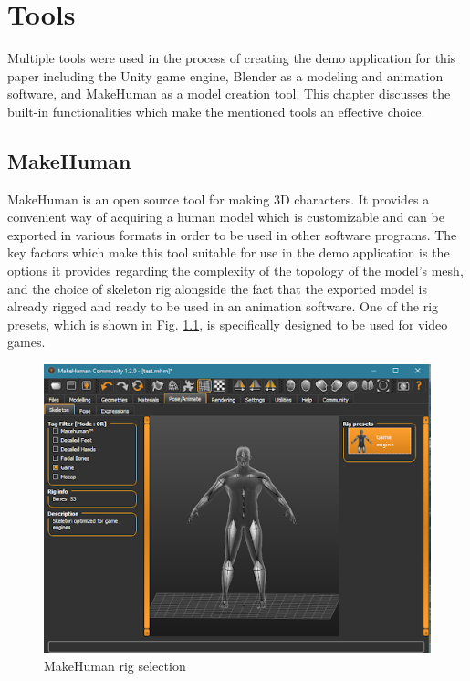 \chapter{Tools} 
Multiple tools were used in the process of creating the demo application for
this paper including the Unity game engine, Blender as a modeling and animation
software, and MakeHuman as a model creation tool. This chapter discusses the
built-in functionalities which make the mentioned tools an effective choice.

\section{MakeHuman}
MakeHuman is an open source tool for making 3D characters. It provides
a convenient way of acquiring a human model which is customizable and can be
exported in various formats in order to be used in other software programs. The
key factors which make this tool suitable for use in the demo application is the
options it provides regarding the complexity of the topology of the model's
mesh, and the choice of skeleton rig alongside the fact that the exported model
is already rigged and ready to be used in an animation software. One of the rig
presets, which is shown in Fig. \ref{fig:mh_rig}, is specifically designed to be
used for video games.

\begin{figure}
    \centering
    \includegraphics[width=\textwidth]{grafika/make_human_rig.png}
    \caption{MakeHuman rig selection}
    \label{fig:mh_rig}
\end{figure}

